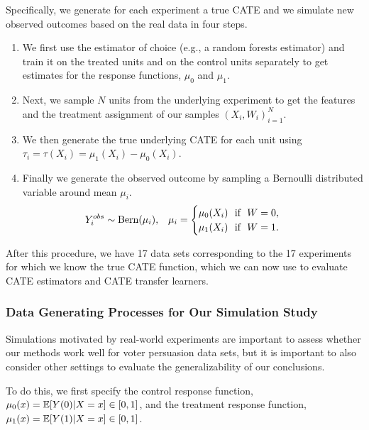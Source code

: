 Specifically, we generate for each experiment a true CATE and we simulate new observed outcomes based on the real data in four steps.
\begin{enumerate}
\item We first use the estimator of choice (e.g., a random forests estimator) and train it on the treated units and on the control units separately to get estimates for the response functions, $\mu_0$ and $\mu_1$.
\item Next, we sample $N$ units from the underlying experiment to get the features and the treatment assignment of our samples $(X_i, W_i)_{i=1}^N$.
\item We then generate the true underlying CATE for each unit using $\tau_i = \tau(X_i) = \mu_1(X_i) - \mu_0(X_i)$.
\item Finally we generate the observed outcome by sampling a Bernoulli distributed variable around mean $\mu_i$. 
  \begin{align*}
  	&Y^{obs}_i \sim \mbox{Bern}(\mu_i),&
    &\mu_i = 
    \begin{cases}
    \mu_0(X_i) ~ ~ \mbox{if} ~ ~ W = 0,\\
    \mu_1(X_i) ~ ~ \mbox{if} ~ ~ W = 1.
    \end{cases}&
  \end{align*}
\end{enumerate}

After this procedure, we have 17 data sets corresponding to the 17 experiments for which we know the true CATE function, which we can now use to evaluate CATE estimators and CATE transfer learners.

\subsubsection{Data Generating Processes for Our Simulation Study}
Simulations motivated by real-world experiments are important to assess whether our methods work well for voter persuasion data sets, but it is important to also consider other settings to evaluate the generalizability of our conclusions. 

To do this, we first specify the control response function, $\mu_0(x) = \mathbb{E}[Y(0)|X = x] \in [0,1]$, 
and the treatment response function, $\mu_1(x) = \mathbb{E}[Y(1)|X = x] \in [0,1]$.

